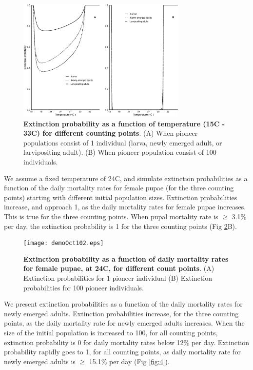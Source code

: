 \documentclass[smallextended]{svjour3}
\begin{document}
\begin{figure}[h]
	\includegraphics[width=0.75\textwidth]{Nov26-1.eps}
	\caption{{\bf Extinction probability as a function of temperature (15\degree C - 33\degree C) for different counting points}. (A) When pioneer populations consist of 1 individual (larva, newly emerged adult, or larvipositing adult). (B) When pioneer population consist of 100 individuals.}
	\label{fig:2}
\end{figure}
%
\newpage

 We assume a fixed temperature of 24\degree C, and simulate extinction probabilities  as a function of the daily mortality rates for female pupae (for the three counting points) starting with different initial population sizes. Extinction probabilities increase, and approach 1, as the daily mortality rates for female pupae increases. This is true for the three counting points. When pupal mortality rate is $\geq$ 3.1\% per day, the extinction probability is 1 for the three counting points (Fig \ref{fig:3}B).   

\begin{figure}[h]
	\texttt{[image: demoOct102.eps]}
		\caption{{\bf Extinction probability as a function of daily mortality rates for female pupae, at 24\degree C, for different count points}. (A) Extinction probabilities for 1 pioneer individual (B) Extinction probabilities for 100 pioneer individuals.}
	\label{fig:3}       %
\end{figure}
%

We present extinction probabilities as a function of the daily mortality rates for newly emerged adults. Extinction probabilities increase, for the three counting points, as the daily mortality rate for newly emerged adults increases. When the size of the initial population is increased to 100, for all counting points, extinction probability is 0 for daily mortality rates below 12\% per day. Extinction probability rapidly goes to 1, for all counting points, as daily mortality rate for newly emerged adults is $\geq$ 15.1\% per day (Fig \ref{fig:4}).
\end{document}
